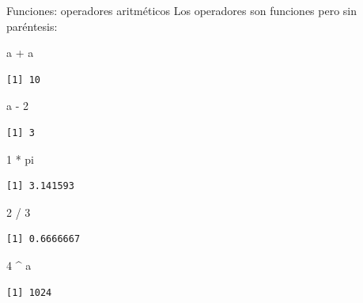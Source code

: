 \documentclass[
  9pt,
  ignorenonframetext,
]{beamer}
\newenvironment{Shaded}{\begin{snugshade}}{\end{snugshade}}
\newcommand{\DecValTok}[1]{\textcolor[rgb]{0.68,0.00,0.00}{#1}}
\newcommand{\NormalTok}[1]{\textcolor[rgb]{0.00,0.23,0.31}{#1}}
\newcommand{\SpecialCharTok}[1]{\textcolor[rgb]{0.37,0.37,0.37}{#1}}
\begin{document}
\begin{frame}[fragile]{Funciones: operadores aritméticos}
\label{funciones-operadores-aritmuxe9ticos}
Los operadores son funciones pero sin paréntesis:

\begin{Shaded}
\begin{Highlighting}[]
\NormalTok{a }\SpecialCharTok{+}\NormalTok{ a}
\end{Highlighting}
\end{Shaded}

\begin{verbatim}
[1] 10
\end{verbatim}

\begin{Shaded}
\begin{Highlighting}[]
\NormalTok{a }\SpecialCharTok{{-}} \DecValTok{2}
\end{Highlighting}
\end{Shaded}

\begin{verbatim}
[1] 3
\end{verbatim}

\begin{Shaded}
\begin{Highlighting}[]
\DecValTok{1} \SpecialCharTok{*}\NormalTok{ pi}
\end{Highlighting}
\end{Shaded}

\begin{verbatim}
[1] 3.141593
\end{verbatim}

\begin{Shaded}
\begin{Highlighting}[]
\DecValTok{2} \SpecialCharTok{/} \DecValTok{3}
\end{Highlighting}
\end{Shaded}

\begin{verbatim}
[1] 0.6666667
\end{verbatim}

\begin{Shaded}
\begin{Highlighting}[]
\DecValTok{4} \SpecialCharTok{\^{}}\NormalTok{ a}
\end{Highlighting}
\end{Shaded}

\begin{verbatim}
[1] 1024
\end{verbatim}
\end{frame}
\end{document}
